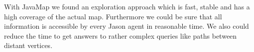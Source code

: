 With JavaMap we found an exploration approach which is fast, stable and has a high coverage of the actual map. Furthermore we could be sure that all information is accessible by every Jason agent in reasonable time. We also could reduce the time to get answers to rather complex queries like paths between distant vertices.
